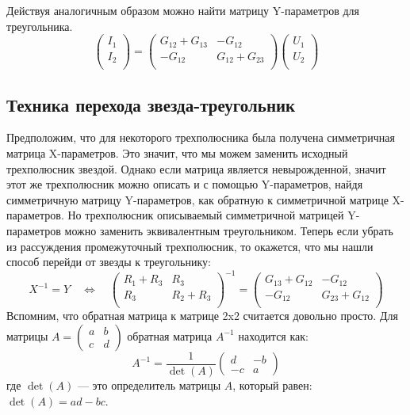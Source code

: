 \documentclass[11pt,a4paper]{article}
\begin{document}
Действуя аналогичным образом можно найти матрицу Y-параметров для треугольника.
$$
\begin{pmatrix} I_1\\ I_2\\\end{pmatrix}
=
\begin{pmatrix}
G_{12}+G_{13} & -G_{12} \\ -G_{12} & G_{12} + G_{23}\\
\end{pmatrix}
\begin{pmatrix} U_1\\ U_2\\\end{pmatrix}
$$
\subsection*{Техника перехода звезда-треугольник}
Предположим, что для некоторого трехполюсника была получена симметричная матрица X-параметров. Это значит, что мы можем заменить 
исходный трехполюсник звездой. Однако если матрица является невырожденной, значит этот же трехполюсник можно описать и с помощью 
Y-параметров, найдя симметричную матрицу Y-параметров, как обратную к симметричной матрице X-параметров.
Но трехполюсник описываемый симметричной матрицей Y-параметров можно заменить эквивалентным треугольником. Теперь если убрать из 
рассуждения промежуточный трехполюсник, то окажется, что мы нашли способ перейди от звезды к треугольнику:
$$
X^{-1} = Y \quad \Leftrightarrow \quad
\begin{pmatrix}
R_1 + R_3 & R_3 \\ R_3 & R_2 + R_3\\
\end{pmatrix}^{-1}
=
\begin{pmatrix}
G_{13} + G_{12} & -G_{12} \\ -G_{12} & G_{23}+G_{12}\\
\end{pmatrix}
$$
Вспомним, что обратная матрица к матрице 2x2 считается довольно просто.
Для матрицы $A = \begin{pmatrix} a & b \\ c & d \end{pmatrix}$ обратная матрица $A^{-1}$ находится как: 
$$A^{-1} = \frac{1}{\det(A)} \begin{pmatrix} d & -b \\ -c & a \end{pmatrix}$$
где $\det(A)$ — это определитель матрицы $A$, который равен: $\det(A) = ad - bc$.
\end{document}
